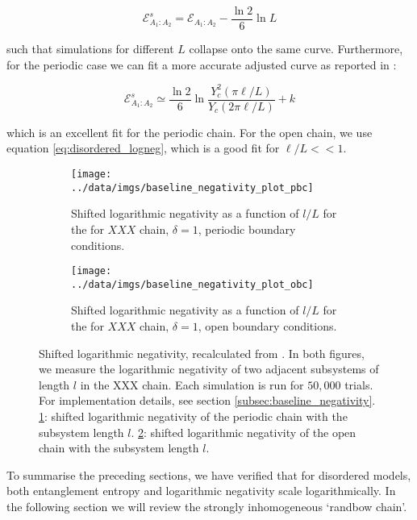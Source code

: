 \begin{equation}\label{eq:shifted negativity}
\mathcal{E}_{A_{1}: A_{2}}^{s}=\mathcal{E}_{A_{1}: A_{2}}-\frac{\ln 2}{6} \ln L
\end{equation}

such that simulations for different $L$ collapse onto the same curve. Furthermore, for the periodic case we can fit a more accurate adjusted curve as reported in \cite{paola2018}:

\begin{equation}
\mathcal{E}_{A_1: A_2}^s \simeq \frac{\ln 2}{6} \ln \frac{Y_c^2(\pi \ell / L)}{Y_c(2 \pi \ell / L)}+k
\end{equation}

which is an excellent fit for the periodic chain. For the open chain, we use equation \ref{eq:disordered_logneg}, which is a good fit for $\ell/L << 1$. 


\begin{figure}
     \centering
     \begin{subfigure}[b]{0.49\textwidth}
   \centering
    \texttt{[image: ../data/imgs/baseline\_negativity\_plot\_pbc]}
    \caption{Shifted logarithmic negativity as a function of $l/L$ for the for $XXX$ chain, $\delta = 1$, periodic boundary conditions.}
    \label{fig:baseline_negativity_pbc}
\end{subfigure}%
     \hfill
     \begin{subfigure}[b]{0.49\textwidth}
         \centering
    \texttt{[image: ../data/imgs/baseline\_negativity\_plot\_obc]}
    \caption{Shifted logarithmic negativity as a function of $l/L$ for the for $XXX$ chain, $\delta = 1$, open boundary conditions.}
    \label{fig:baseline_negativity_obc}
     \end{subfigure}
            \caption{Shifted logarithmic negativity, recalculated from \cite{paola2016}. In both figures, we measure the logarithmic negativity of two adjacent subsystems of length $l$ in the XXX chain. Each simulation is run for $50,000$ trials. For implementation details, see section \ref{subsec:baseline_negativity}. \ref{fig:baseline_negativity_pbc}: shifted logarithmic negativity of the periodic chain with the subsystem length $l$. \ref{fig:baseline_negativity_obc}: shifted logarithmic negativity of the open chain with the subsystem length $l$.}
        \label{fig:baseline_negativity}
\end{figure}

To summarise the preceding sections, we have verified that for disordered models, both entanglement entropy and logarithmic negativity scale logarithmically. In the following section we will review the strongly inhomogeneous `randbow chain'. 